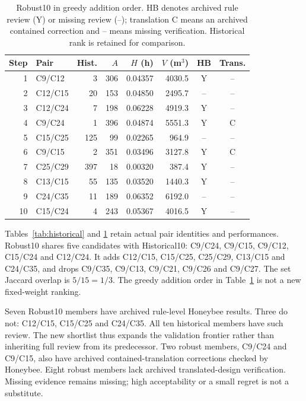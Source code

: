 \documentclass{llncs}
\begin{document}
\begin{table}[tbp]\caption{Robust10 in greedy addition order. HB denotes archived rule review (Y) or missing review (--); translation C means an archived contained correction and -- means missing verification. Historical rank is retained for comparison.}\label{tab:robust}\centering
\small
\begin{tabular}{rlrrrrcc}\toprule
Step & Pair & Hist. & $A$ & $H$ (h) & $V$ (m$^3$) & HB & Trans.\\\midrule
1 & C9/C12 & 3 & 306 & 0.04357 & 4030.5 & Y & --\\
2 & C12/C15 & 20 & 153 & 0.04850 & 2495.7 & -- & --\\
3 & C12/C24 & 7 & 198 & 0.06228 & 4919.3 & Y & --\\
4 & C9/C24 & 1 & 396 & 0.04874 & 5551.3 & Y & C\\
5 & C15/C25 & 125 & 99 & 0.02265 & 964.9 & -- & --\\
6 & C9/C15 & 2 & 351 & 0.03496 & 3127.8 & Y & C\\
7 & C25/C29 & 397 & 18 & 0.00320 & 387.4 & Y & --\\
8 & C13/C15 & 55 & 135 & 0.03520 & 1440.3 & Y & --\\
9 & C24/C35 & 11 & 189 & 0.06352 & 6192.0 & -- & --\\
10 & C15/C24 & 4 & 243 & 0.05367 & 4016.5 & Y & --\\
\bottomrule\end{tabular}

\end{table}



Tables~\ref{tab:historical} and \ref{tab:robust} retain actual pair identities and performances. Robust10 shares five candidates with Historical10: C9/C24, C9/C15, C9/C12, C15/C24 and C12/C24. It adds C12/C15, C15/C25, C25/C29, C13/C15 and C24/C35, and drops C9/C35, C9/C13, C9/C21, C9/C26 and C9/C27. The set Jaccard overlap is $5/15=1/3$. The greedy addition order in Table~\ref{tab:robust} is not a new fixed-weight ranking.

Seven Robust10 members have archived rule-level Honeybee results. Three do not: C12/C15, C15/C25 and C24/C35. All ten historical members have such review. The new shortlist thus expands the validation frontier rather than inheriting full review from its predecessor. Two robust members, C9/C24 and C9/C15, also have archived contained-translation corrections checked by Honeybee. Eight robust members lack archived translated-design verification. Missing evidence remains missing; high acceptability or a small regret is not a substitute.
\end{document}
